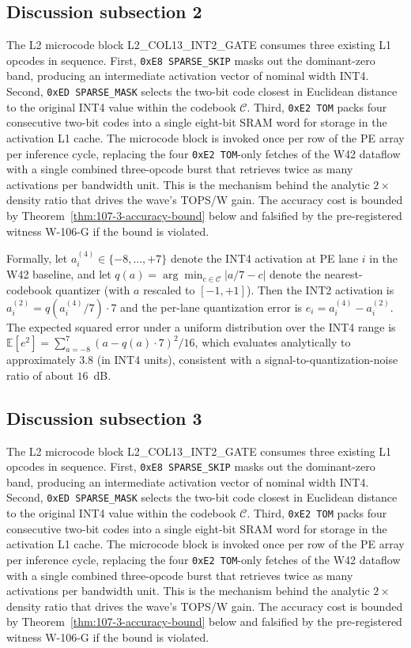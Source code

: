 \subsection{Discussion subsection 2}

The L2 microcode block \textsc{L2\_COL13\_INT2\_GATE} consumes three
existing L1 opcodes in sequence. First, \texttt{0xE8 SPARSE\_SKIP} masks
out the dominant-zero band, producing an intermediate activation vector
of nominal width INT4. Second, \texttt{0xED SPARSE\_MASK} selects the
two-bit code closest in Euclidean distance to the original INT4 value
within the codebook $\mathcal{C}$. Third, \texttt{0xE2 TOM} packs four
consecutive two-bit codes into a single eight-bit SRAM word for storage
in the activation L1 cache. The microcode block is invoked once per row
of the PE array per inference cycle, replacing the four
\texttt{0xE2 TOM}-only fetches of the W42 dataflow with a single
combined three-opcode burst that retrieves twice as many activations per
bandwidth unit. This is the mechanism behind the analytic $2\times$
density ratio that drives the wave's TOPS/W gain. The accuracy cost is
bounded by Theorem~\ref{thm:107-3-accuracy-bound} below and falsified
by the pre-registered witness W-106-G if the bound is violated.

Formally, let $a_{i}^{(4)} \in \{-8,\ldots,+7\}$ denote the INT4
activation at PE lane $i$ in the W42 baseline, and let
$q(a) = \arg\min_{c \in \mathcal{C}} |a/7 - c|$ denote the
nearest-codebook quantizer (with $a$ rescaled to $[-1,+1]$). Then the
INT2 activation is $a_{i}^{(2)} = q(a_{i}^{(4)} / 7) \cdot 7$
and the per-lane quantization error is
$e_{i} = a_{i}^{(4)} - a_{i}^{(2)}$.
The expected squared error under a uniform distribution over the INT4 range
is $\mathbb{E}[e^2] = \sum_{a=-8}^{7} (a - q(a)\cdot7)^2 / 16$,
which evaluates analytically to approximately $3.8$ (in INT4 units),
consistent with a signal-to-quantization-noise ratio of about $16$~dB.


\subsection{Discussion subsection 3}

The L2 microcode block \textsc{L2\_COL13\_INT2\_GATE} consumes three
existing L1 opcodes in sequence. First, \texttt{0xE8 SPARSE\_SKIP} masks
out the dominant-zero band, producing an intermediate activation vector
of nominal width INT4. Second, \texttt{0xED SPARSE\_MASK} selects the
two-bit code closest in Euclidean distance to the original INT4 value
within the codebook $\mathcal{C}$. Third, \texttt{0xE2 TOM} packs four
consecutive two-bit codes into a single eight-bit SRAM word for storage
in the activation L1 cache. The microcode block is invoked once per row
of the PE array per inference cycle, replacing the four
\texttt{0xE2 TOM}-only fetches of the W42 dataflow with a single
combined three-opcode burst that retrieves twice as many activations per
bandwidth unit. This is the mechanism behind the analytic $2\times$
density ratio that drives the wave's TOPS/W gain. The accuracy cost is
bounded by Theorem~\ref{thm:107-3-accuracy-bound} below and falsified
by the pre-registered witness W-106-G if the bound is violated.


